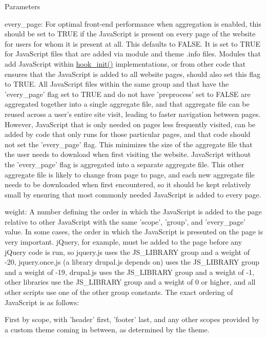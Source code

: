 \begin{DoxyParams}{Parameters}
\begin{DoxyItemize}
\begin{DoxyItemize}
\end{DoxyItemize}
\item every\_\-page: For optimal front-\/end performance when aggregation is enabled, this should be set to TRUE if the JavaScript is present on every page of the website for users for whom it is present at all. This defaults to FALSE. It is set to TRUE for JavaScript files that are added via module and theme .info files. Modules that add JavaScript within \hyperlink{group__hooks_ga74edef0c463436fdbb1f92ef367db051}{hook\_\-init()} implementations, or from other code that ensures that the JavaScript is added to all website pages, should also set this flag to TRUE. All JavaScript files within the same group and that have the 'every\_\-page' flag set to TRUE and do not have 'preprocess' set to FALSE are aggregated together into a single aggregate file, and that aggregate file can be reused across a user's entire site visit, leading to faster navigation between pages. However, JavaScript that is only needed on pages less frequently visited, can be added by code that only runs for those particular pages, and that code should not set the 'every\_\-page' flag. This minimizes the size of the aggregate file that the user needs to download when first visiting the website. JavaScript without the 'every\_\-page' flag is aggregated into a separate aggregate file. This other aggregate file is likely to change from page to page, and each new aggregate file needs to be downloaded when first encountered, so it should be kept relatively small by ensuring that most commonly needed JavaScript is added to every page.
\item weight: A number defining the order in which the JavaScript is added to the page relative to other JavaScript with the same 'scope', 'group', and 'every\_\-page' value. In some cases, the order in which the JavaScript is presented on the page is very important. jQuery, for example, must be added to the page before any jQuery code is run, so jquery.js uses the JS\_\-LIBRARY group and a weight of -\/20, jquery.once.js (a library drupal.js depends on) uses the JS\_\-LIBRARY group and a weight of -\/19, drupal.js uses the JS\_\-LIBRARY group and a weight of -\/1, other libraries use the JS\_\-LIBRARY group and a weight of 0 or higher, and all other scripts use one of the other group constants. The exact ordering of JavaScript is as follows:
\begin{DoxyItemize}
\item First by scope, with 'header' first, 'footer' last, and any other scopes provided by a custom theme coming in between, as determined by the theme.

\end{DoxyItemize}
\end{DoxyItemize}
\end{DoxyParams}

